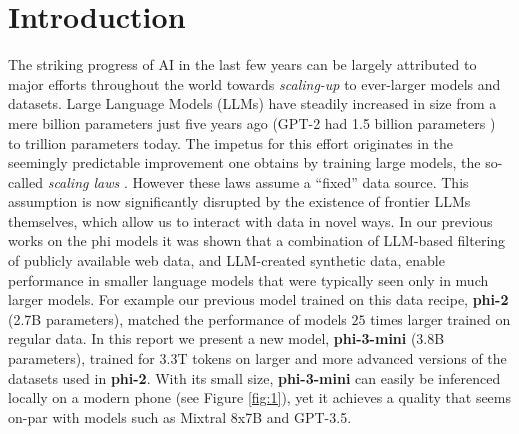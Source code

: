 \section{Introduction}
The striking progress of AI in the last few years can be largely attributed to major efforts throughout the world towards {\em scaling-up} to ever-larger models and datasets. Large Language Models (LLMs) have steadily increased in size from a mere billion parameters just five years ago (GPT-2 had 1.5 billion parameters \cite{radford2019language}) to trillion parameters today. The impetus for this effort originates in the seemingly predictable improvement one obtains by training large models, the so-called {\em scaling laws} \cite{kaplan2020scaling, hoffmann2022training,muennighoff2023scaling}. However these laws assume a ``fixed'' data source. This assumption is now significantly disrupted by the existence of frontier LLMs themselves, which allow us to interact with data in novel ways. In our previous works on the phi models \cite{gunasekar2023textbooks,li2023textbooks, javaheripi2023phi} it was shown that a combination of LLM-based filtering of publicly available web data, and LLM-created synthetic data, enable performance in smaller language models that were typically seen only in much larger models. For example our previous model trained on this data recipe, \textbf{phi-2} (2.7B parameters), matched the performance of models $25$ times larger trained on regular data. In this report we present a new model, \textbf{phi-3-mini} (3.8B parameters), trained for 3.3T tokens on larger and more advanced versions of the datasets used in \textbf{phi-2}. With its small size, \textbf{phi-3-mini} can easily be inferenced locally on a modern phone (see Figure \ref{fig:1}), yet it achieves a quality that seems on-par with models such as Mixtral 8x7B \cite{jiang2024mixtral} and GPT-3.5.

